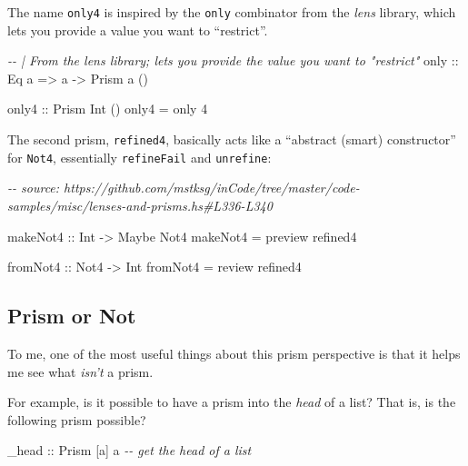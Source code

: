 \documentclass[]{article}
\newenvironment{Shaded}{}{}
\newcommand{\CommentTok}[1]{\textcolor[rgb]{0.38,0.63,0.69}{\textit{#1}}}
\newcommand{\DataTypeTok}[1]{\textcolor[rgb]{0.56,0.13,0.00}{#1}}
\newcommand{\DecValTok}[1]{\textcolor[rgb]{0.25,0.63,0.44}{#1}}
\newcommand{\NormalTok}[1]{#1}
\newcommand{\OtherTok}[1]{\textcolor[rgb]{0.00,0.44,0.13}{#1}}
\begin{document}
The name \texttt{only4} is inspired by the \texttt{only} combinator from the
\emph{lens} library, which lets you provide a value you want to ``restrict''.

\begin{Shaded}
\begin{Highlighting}[]
\CommentTok{{-}{-} | From the lens library; lets you provide the value you want to "restrict"}
\OtherTok{only ::} \DataTypeTok{Eq}\NormalTok{ a }\OtherTok{=>}\NormalTok{ a }\OtherTok{{-}>} \DataTypeTok{Prism\textquotesingle{}}\NormalTok{ a ()}

\OtherTok{only4 ::} \DataTypeTok{Prism\textquotesingle{}} \DataTypeTok{Int}\NormalTok{ ()}
\NormalTok{only4 }\OtherTok{=}\NormalTok{ only }\DecValTok{4}
\end{Highlighting}
\end{Shaded}

The second prism, \texttt{refined4}, basically acts like a ``abstract (smart)
constructor'' for \texttt{Not4}, essentially \texttt{refineFail} and
\texttt{unrefine}:

\begin{Shaded}
\begin{Highlighting}[]
\CommentTok{{-}{-} source: https://github.com/mstksg/inCode/tree/master/code{-}samples/misc/lenses{-}and{-}prisms.hs\#L336{-}L340}

\OtherTok{makeNot4 ::} \DataTypeTok{Int} \OtherTok{{-}>} \DataTypeTok{Maybe} \DataTypeTok{Not4}
\NormalTok{makeNot4 }\OtherTok{=}\NormalTok{ preview refined4}

\OtherTok{fromNot4 ::} \DataTypeTok{Not4} \OtherTok{{-}>} \DataTypeTok{Int}
\NormalTok{fromNot4 }\OtherTok{=}\NormalTok{ review refined4}
\end{Highlighting}
\end{Shaded}

\hypertarget{prism-or-not}{%
\subsection{Prism or Not}\label{prism-or-not}}

To me, one of the most useful things about this prism perspective is that it
helps me see what \emph{isn't} a prism.

For example, is it possible to have a prism into the \emph{head} of a list? That
is, is the following prism possible?

\begin{Shaded}
\begin{Highlighting}[]
\OtherTok{\_head ::} \DataTypeTok{Prism\textquotesingle{}}\NormalTok{ [a] a           }\CommentTok{{-}{-} get the head of a list}
\end{Highlighting}
\end{Shaded}
\end{document}
